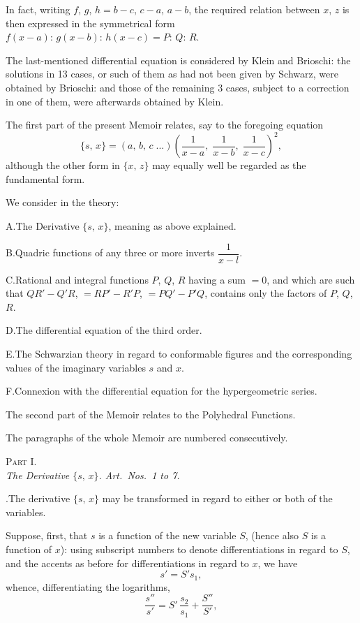 \documentclass[11pt]{article}
\begin{document}
In fact, writing $f$, $g$, $h = b - c$, $c - a$, $a - b$, the required relation between $x$, $z$ is
then expressed in the symmetrical form $f(x - a):\, g(x - b):\, h(x - c) = P:\, Q:\, R$.

The last-mentioned differential equation is considered by Klein and Brioschi: the
solutions in 13 cases, or such of them as had not been given by Schwarz, were
obtained by Brioschi: and those of the remaining 3 cases, subject to a correction in
one of them, were afterwards obtained by Klein.

The first part of the present Memoir relates, say to the foregoing equation
\[
   \{s,\, x\} = (a,\, b,\, c\;.{}.\!.) \left(\frac{1}{x - a},\; \frac{1}{x - b},\; \frac{1}{x - c}\right)^{\!2}\!,
\]
although the other form in $\{x,\, z\}$ may equally well be regarded as the fundamental
form.

We consider in the theory:

\medskip

\noindent
A.\quad The Derivative $\{s,\, x\}$, meaning as above explained.

\noindent
B.\quad Quadric functions of any three or more inverts $\dfrac{1}{x - l}$.

\noindent
C.\quad Rational and integral functions $P$, $Q$, $R$ having a sum $=0$, and which are
such that $QR' - Q'R$, $= RP' - R'P$, $= PQ' - P'Q$, contains only the factors of $P$, $Q$, $R$.

\noindent
D.\quad The differential equation of the third order.

\noindent
E.\quad The Schwarzian theory in regard to conformable figures and the corresponding
values of the imaginary variables $s$ and $x$.

\noindent
F.\quad Connexion with the differential equation for the hypergeometric series.

\medskip

The second part of the Memoir relates to the Polyhedral Functions.

The paragraphs of the whole Memoir are numbered consecutively.

\bigskip

\begin{center}
\textsc{Part I.}\\[4pt]
\textit{The Derivative $\{s,\, x\}$. Art.\ Nos.\ 1 to 7.}
\end{center}

\medskip

.\quad The derivative $\{s,\, x\}$ may be transformed in regard to either or both of the
variables.

Suppose, first, that $s$ is a function of the new variable $S$, (hence also $S$ is a
function of $x$): using subscript numbers to denote differentiations in regard to $S$, and
the accents as before for differentiations in regard to $x$, we have
\[
   s' = S' s_1,
\]
whence, differentiating the logarithms,
\[
   \frac{s''}{s'} = S'\,\frac{s_2}{s_1} + \frac{S''}{S'},
\]
\end{document}
